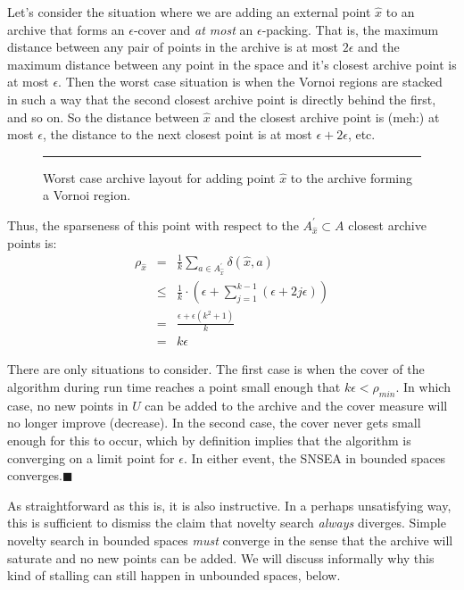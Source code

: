 \documentclass[twoside]{article}
\begin{document}
Let's consider the situation where we are adding an external point $\hat{x}$ to an archive that forms an $\epsilon$-cover and \emph{at most} an $\epsilon$-packing.  That is, the maximum distance between any pair of points in the archive is at most $2\epsilon$ and the maximum distance between any point in the space and it's closest archive point is at most $\epsilon$.  Then the worst case situation is when the Vornoi regions are stacked in such a way that the second closest archive point is directly behind the first, and so on.  So the distance between $\hat{x}$ and the closest archive point is (meh:) at most $\epsilon$, the distance to the next closest point is at most $\epsilon + 2\epsilon$, etc.

\begin{figure}[t]
  \rule{0.9\textwidth}{3cm}
  \caption{\label{fig:vornoi} Worst case archive layout for adding point $\hat{x}$ to the archive forming a Vornoi region.}
\end{figure}

Thus, the sparseness of this point with respect to the $A^\prime_{\hat{x}} \subset A$ closest archive points is:
\begin{eqnarray*}
  \rho_{\hat{x}} & = & \frac{1}{k} \sum_{a \in A^\prime_{\hat{x}}} \delta(\hat{x},a) \\
                 & \leq & \frac{1}{k} \cdot\left( \epsilon + \sum_{j=1}^{k-1} \left( \epsilon + 2j\epsilon \right) \right) \\
                 & = & \frac{\epsilon + \epsilon\left(k^2 +1\right)}{k} \\
                 & = & k\epsilon
\end{eqnarray*}

There are only situations to consider.  The first case is when the cover of the algorithm during run time reaches a point small enough that $k\epsilon < \rho_{min}$.  In which case, no new points in $U$ can be added to the archive and the cover measure will no longer improve (decrease).  In the second case, the cover never gets small enough for this to occur, which by definition implies that the algorithm is converging on a limit point for $\epsilon$.  In either event, the SNSEA in bounded spaces converges.$\blacksquare$

\vspace*{1ex}

As straightforward as this is, it is also instructive.  In a perhaps unsatisfying way, this is sufficient to dismiss the claim that novelty search \emph{always} diverges.  Simple novelty search in bounded spaces \emph{must} converge in the sense that the archive will saturate and no new points can be added.  We will discuss informally why this kind of stalling can still happen in unbounded spaces, below.
\end{document}
